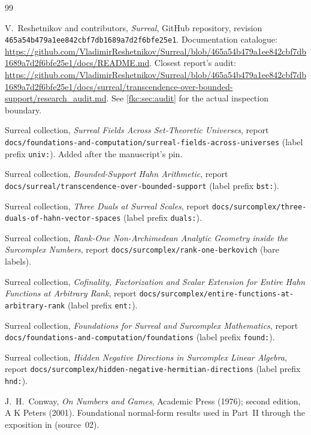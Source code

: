 \documentclass[11pt,letterpaper]{article}
\numberwithin{equation}{section}
\theoremstyle{definition}
\theoremstyle{remark}
\begin{document}
\begin{thebibliography}{99}
\begingroup\raggedright
V.~Reshetnikov and contributors,
\emph{Surreal}, GitHub repository, revision
\texttt{465a54b479a1ee842cbf7db1689a7d2f6bfe25e1}.
Documentation catalogue:
\url{https://github.com/VladimirReshetnikov/Surreal/blob/465a54b479a1ee842cbf7db1689a7d2f6bfe25e1/docs/README.md}.
Closest report's audit:
\url{https://github.com/VladimirReshetnikov/Surreal/blob/465a54b479a1ee842cbf7db1689a7d2f6bfe25e1/docs/surreal/transcendence-over-bounded-support/research_audit.md}.
See \cref{fkc:sec:audit} for the actual inspection boundary.
\par\endgroup

\begingroup\raggedright
{}
Surreal collection, \emph{Surreal Fields Across Set-Theoretic Universes},
report \nolinkurl{docs/foundations-and-computation/surreal-fields-across-universes}
(label prefix \texttt{univ:}). Added after the manuscript's pin.

Surreal collection, \emph{Bounded-Support Hahn Arithmetic},
report \nolinkurl{docs/surreal/transcendence-over-bounded-support}
(label prefix \texttt{bst:}).

Surreal collection, \emph{Three Duals at Surreal Scales},
report \nolinkurl{docs/surcomplex/three-duals-of-hahn-vector-spaces}
(label prefix \texttt{duals:}).

Surreal collection, \emph{Rank-One Non-Archimedean Analytic Geometry inside the Surcomplex Numbers},
report \nolinkurl{docs/surcomplex/rank-one-berkovich} (bare labels).

Surreal collection, \emph{Cofinality, Factorization and Scalar Extension for Entire Hahn Functions at Arbitrary Rank},
report \nolinkurl{docs/surcomplex/entire-functions-at-arbitrary-rank}
(label prefix \texttt{ent:}).

Surreal collection, \emph{Foundations for Surreal and Surcomplex Mathematics},
report \nolinkurl{docs/foundations-and-computation/foundations}
(label prefix \texttt{found:}).

Surreal collection, \emph{Hidden Negative Directions in Surcomplex Linear Algebra},
report \nolinkurl{docs/surcomplex/hidden-negative-hermitian-directions}
(label prefix \texttt{hnd:}).
\par\endgroup

J.~H.~Conway,
\emph{On Numbers and Games},
Academic Press (1976); second edition, A K Peters (2001).
Foundational normal-form results used in Part~II through the exposition in \cite{MM} (source~02).


\end{thebibliography}
\end{document}
